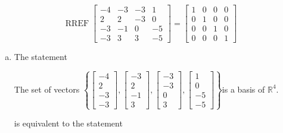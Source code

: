\begin{exerciseAnswer} 


\[\operatorname{RREF} \left[\begin{array}{cccc}
-4 & -3 & -3 & 1 \\
2 & 2 & -3 & 0 \\
-3 & -1 & 0 & -5 \\
-3 & 3 & 3 & -5
\end{array}\right] = \left[\begin{array}{cccc}
1 & 0 & 0 & 0 \\
0 & 1 & 0 & 0 \\
0 & 0 & 1 & 0 \\
0 & 0 & 0 & 1
\end{array}\right] \]


\begin{enumerate}[(a)]
\item The statement 
\begin{center}\begin{minipage}{0.8\textwidth}
 The set of vectors \( \left\{ \left[\begin{array}{c}
-4 \\
2 \\
-3 \\
-3
\end{array}\right] , \left[\begin{array}{c}
-3 \\
2 \\
-1 \\
3
\end{array}\right] , \left[\begin{array}{c}
-3 \\
-3 \\
0 \\
3
\end{array}\right] , \left[\begin{array}{c}
1 \\
0 \\
-5 \\
-5
\end{array}\right] \right\} \)is a basis of \(\mathbb{R}^4\). 
\end{minipage}\end{center}
     is equivalent to the statement 
\begin{center}\begin{minipage}{0.8\textwidth}
 The set of vectors \( \left\{ \left[\begin{array}{c}
-4 \\
2 \\

\end{array}
\end{minipage}
\end{center}
\end{enumerate}
\end{exerciseAnswer}
